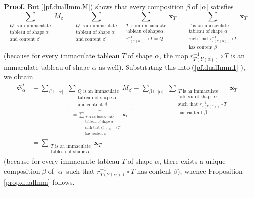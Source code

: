 \documentclass
[numbers=enddot,12pt,final,onecolumn,notitlepage,abstracton]{scrartcl}%
\theoremstyle{definition}
\newenvironment{proof}[1][Proof]{\noindent\textbf{#1.} }{\ \rule{0.5em}{0.5em}}
\let\sumnonlimits\sum
\renewcommand{\sum}{\sumnonlimits\limits}
\begin{document}
\begin{proof}
But (\ref{pf.dualImm.M}) shows that every composition $\beta$ of $\left\vert
\alpha\right\vert $ satisfies%
\[
\sum_{\substack{Q\text{ is an immaculate}\\\text{tableau of shape }%
\alpha\\\text{and content }\beta}}M_{\beta}=\sum_{\substack{Q\text{ is an
immaculate}\\\text{tableau of shape }\alpha\\\text{and content }\beta
}}\ \ \sum_{\substack{T\text{ is an immaculate}\\\text{tableau of shape
}\alpha;\\r_{T\left(  Y\left(  \alpha\right)  \right)  }^{-1}\circ
T=Q}}\mathbf{x}_{T}=\sum_{\substack{T\text{ is an immaculate}\\\text{tableau
of shape }\alpha\\\text{such that }r_{T\left(  Y\left(  \alpha\right)
\right)  }^{-1}\circ T\\\text{has content }\beta}}\mathbf{x}_{T}%
\]
(because for every immaculate tableau $T$ of shape $\alpha$, the map
$r_{T\left(  Y\left(  \alpha\right)  \right)  }^{-1}\circ T$ is an immaculate
tableau of shape $\alpha$ as well). Substituting this into (\ref{pf.dualImm.1}%
), we obtain%
\begin{align*}
\mathfrak{S}_{\alpha}^{\ast}  &  =\sum_{\beta\models\left\vert \alpha
\right\vert }\ \ \underbrace{\sum_{\substack{Q\text{ is an immaculate}%
\\\text{tableau of shape }\alpha\\\text{and content }\beta}}M_{\beta}}%
_{=\sum_{\substack{T\text{ is an immaculate}\\\text{tableau of shape }%
\alpha\\\text{such that }r_{T\left(  Y\left(  \alpha\right)  \right)  }%
^{-1}\circ T\\\text{has content }\beta}}\mathbf{x}_{T}}=\sum_{\beta
\models\left\vert \alpha\right\vert }\ \ \sum_{\substack{T\text{ is an
immaculate}\\\text{tableau of shape }\alpha\\\text{such that }r_{T\left(
Y\left(  \alpha\right)  \right)  }^{-1}\circ T\\\text{has content }\beta
}}\mathbf{x}_{T}\\
&  =\sum_{\substack{T\text{ is an immaculate}\\\text{tableau of shape }\alpha
}}\mathbf{x}_{T}%
\end{align*}
(because for every immaculate tableau $T$ of shape $\alpha$, there exists a
unique composition $\beta$ of $\left\vert \alpha\right\vert $ such that
$r_{T\left(  Y\left(  \alpha\right)  \right)  }^{-1}\circ T$ has content
$\beta$), whence Proposition \ref{prop.dualImm} follows.
\end{proof}
\end{document}

